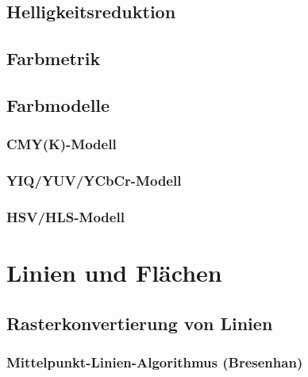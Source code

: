 \documentclass{scrreprt}
\begin{document}
\section{Helligkeitsreduktion}
\section{Farbmetrik}

\section{Farbmodelle}
\subsection{CMY(K)-Modell}
\subsection{YIQ/YUV/YCbCr-Modell}
\subsection{HSV/HLS-Modell}

\chapter{Linien und Flächen}
\section{Rasterkonvertierung von Linien}

\subsection{Mittelpunkt-Linien-Algorithmus (Bresenhan)}
\end{document}
